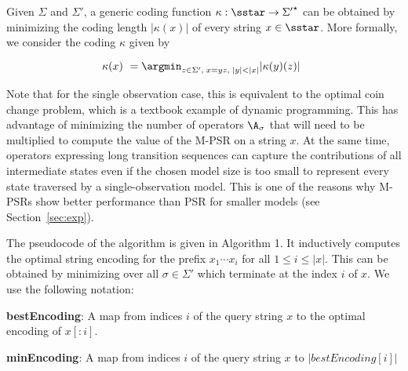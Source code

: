 Given $\Sigma$ and $\Sigma'$, a generic coding function $\kappa : \sstar \to {\Sigma'}^\star$ can be obtained by minimizing the coding length $|\kappa(x)|$ of every string $x \in \sstar$. More formally, we consider the coding $\kappa$ given by

\begin{equation*}
\kappa(x) ~= \argmin_{ z \in \Sigma', \; x=yz, \; |y|<|x|} |\kappa(y)(z)| \enspace 
\end{equation*}

Note that for the single observation case, this is equivalent to the optimal coin change problem, which is a textbook example of dynamic programming. This has advantage of minimizing the number of operators $\A_\sigma$ that will need to be multiplied to compute the value of the M-PSR on a string $x$. At the same time, operators expressing long transition sequences can capture the contributions of all intermediate states even if the chosen model size is too small to represent every state traversed by a single-observation model. This is one of the reasons why M-PSRs show better performance than PSR for smaller models (see Section~\ref{sec:exp}).




%

The pseudocode of the algorithm is given in Algorithm 1. It inductively computes the optimal string encoding for the prefix $x_1 \cdots x_i$ for all $1 \leq i \leq |x|$. This can be obtained by minimizing over all $\sigma \in \Sigma'$ which terminate at the index $i$ of $x$.
We use the following notation:

\textbf{bestEncoding}: A map from indices $i$ of the query string $x$ to the optimal encoding of $x[:i]$.

\textbf{minEncoding}: A map from indices $i$ of the query string $x$ to $|bestEncoding[i]|$

